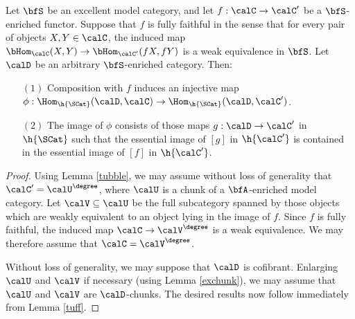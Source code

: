 \begin{corollary}\label{suff}
Let $\bfS$ be an excellent model category, and let $f: \calC \rightarrow \calC'$ be a $\bfS$-enriched functor. Suppose that $f$ is fully faithful in the sense that for every pair of objects
$X,Y \in \calC$, the induced map $\bHom_{\calC}( X,Y) \rightarrow \bHom_{\calC'}(fX, fY)$ is a
weak equivalence in $\bfS$. Let $\calD$ be an arbitrary $\bfS$-enriched category. Then:
\begin{itemize}
\item[$(1)$] Composition with $f$ induces an injective map
$\phi: \Hom_{ \h{\SCat}} ( \calD, \calC) \rightarrow \Hom_{ \h{\SCat}}( \calD, \calC' )$.
\item[$(2)$] The image of $\phi$ consists of those maps
$g: \calD \rightarrow \calC'$ in $\h{\SCat}$ such that the essential image of
$[g]$ in $\h{\calC'}$ is contained in the essential image of $[f]$ in $\h{\calC'}$. 
\end{itemize}
\end{corollary}

\begin{proof}
Using Lemma \ref{tubble}, we may assume without loss of generality that
$\calC' = \calU^{\degree}$, where $\calU$ is a chunk of a $\bfA$-enriched model category.
Let $\calV \subseteq \calU$ be the full subcategory spanned by those objects which
are weakly equivalent to an object lying in the image of $f$. Since $f$ is fully faithful,
the induced map $\calC \rightarrow \calV^{\degree}$ is a weak equivalence. We may therefore
assume that $\calC = \calV^{\degree}$. 

Without loss of generality, we may suppose that $\calD$ is cofibrant. 
Enlarging $\calU$ and $\calV$ if necessary (using Lemma \ref{exchunk}), we may assume
that $\calU$ and $\calV$ are $\calD$-chunks. 
The desired results now follow immediately from Lemma \ref{tuff}.
\end{proof} 



